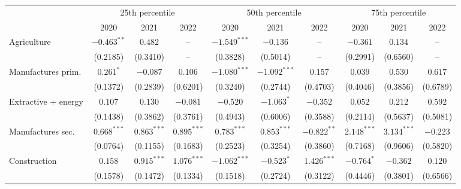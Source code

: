 \begin{tabular}{l|ccc|ccc|ccc|}
\toprule
{} & \multicolumn{3}{c}{25th percentile} & \multicolumn{3}{c}{50th percentile} & \multicolumn{3}{c}{75th percentile} \\
{} &            2020 &           2021 &            2022 &            2020 &            2021 &            2022 &            2020 &           2021 &      2022 \\
\midrule
Agriculture                      &   $-0.463^{**}$ &        $0.482$ &              -- &  $-1.549^{***}$ &        $-0.136$ &              -- &        $-0.361$ &        $0.134$ &        -- \\
                                 &        (0.2185) &       (0.3410) &              -- &        (0.3828) &        (0.5014) &              -- &        (0.2991) &       (0.6560) &        -- \\
Manufactures prim.               &       $0.261^*$ &       $-0.087$ &         $0.106$ &  $-1.080^{***}$ &  $-1.092^{***}$ &         $0.157$ &         $0.039$ &        $0.530$ &   $0.617$ \\
                                 &        (0.1372) &       (0.2839) &        (0.6201) &        (0.3240) &        (0.2744) &        (0.4703) &        (0.4046) &       (0.3856) &  (0.6789) \\
Extractive + energy              &         $0.107$ &        $0.130$ &        $-0.081$ &        $-0.520$ &      $-1.063^*$ &        $-0.352$ &         $0.052$ &        $0.212$ &   $0.592$ \\
                                 &        (0.1438) &       (0.3862) &        (0.3761) &        (0.4943) &        (0.6006) &        (0.3588) &        (0.2114) &       (0.5637) &  (0.5081) \\
Manufactures sec.                &   $0.668^{***}$ &  $0.863^{***}$ &   $0.895^{***}$ &   $0.783^{***}$ &   $0.853^{***}$ &   $-0.822^{**}$ &   $2.148^{***}$ &  $3.134^{***}$ &  $-0.223$ \\
                                 &        (0.0764) &       (0.1155) &        (0.1683) &        (0.2523) &        (0.3254) &        (0.3860) &        (0.7168) &       (0.9606) &  (0.5820) \\
Construction                     &         $0.158$ &  $0.915^{***}$ &   $1.076^{***}$ &  $-1.062^{***}$ &      $-0.523^*$ &   $1.426^{***}$ &      $-0.764^*$ &       $-0.362$ &   $0.120$ \\
                                 &        (0.1578) &       (0.1472) &        (0.1334) &        (0.1518) &        (0.2724) &        (0.3122) &        (0.4446) &       (0.3801) &  (0.6566) \\

\end{tabular}

